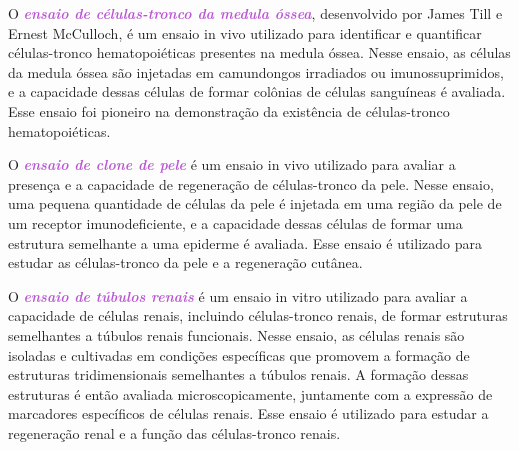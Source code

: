 \documentclass[11pt,a4paper]{article}
\begin{document}
	O \textcolor{MediumOrchid}{\textbf{\textit{ensaio de células-tronco da medula óssea}}}, desenvolvido por James Till e Ernest McCulloch, é um ensaio in vivo utilizado para identificar e quantificar células-tronco hematopoiéticas presentes na medula óssea. Nesse ensaio, as células da medula óssea são injetadas em camundongos irradiados ou imunossuprimidos, e a capacidade dessas células de formar colônias de células sanguíneas é avaliada. Esse ensaio foi pioneiro na demonstração da existência de células-tronco hematopoiéticas.

	O \textcolor{MediumOrchid}{\textbf{\textit{ensaio de clone de pele}}} é um ensaio in vivo utilizado para avaliar a presença e a capacidade de regeneração de células-tronco da pele. Nesse ensaio, uma pequena quantidade de células da pele é injetada em uma região da pele de um receptor imunodeficiente, e a capacidade dessas células de formar uma estrutura semelhante a uma epiderme é avaliada. Esse ensaio é utilizado para estudar as células-tronco da pele e a regeneração cutânea.

	O \textcolor{MediumOrchid}{\textbf{\textit{ensaio de túbulos renais}}} é um ensaio in vitro utilizado para avaliar a capacidade de células renais, incluindo células-tronco renais, de formar estruturas semelhantes a túbulos renais funcionais. Nesse ensaio, as células renais são isoladas e cultivadas em condições específicas que promovem a formação de estruturas tridimensionais semelhantes a túbulos renais. A formação dessas estruturas é então avaliada microscopicamente, juntamente com a expressão de marcadores específicos de células renais. Esse ensaio é utilizado para estudar a regeneração renal e a função das células-tronco renais.



\end{document}

